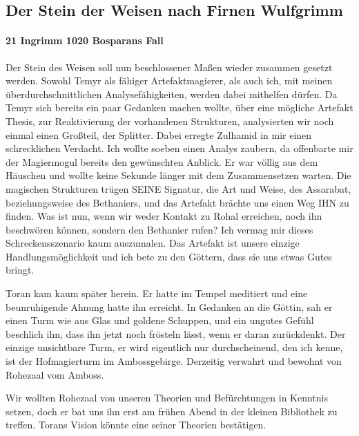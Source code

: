 \subsection{Der Stein der Weisen nach Firnen Wulfgrimm}

\paragraph{21 Ingrimm 1020 Bosparans Fall}
Der Stein des Weisen soll nun beschlossener Maßen wieder zusammen gesetzt werden. Sowohl Temyr als fähiger Artefaktmagierer, als auch ich, mit meinen überdurchschnittlichen Analysefähigkeiten, werden dabei mithelfen dürfen. Da Temyr sich bereits ein paar Gedanken machen wollte, über eine mögliche Artefakt Thesis, zur Reaktivierung der vorhandenen Strukturen, analysierten wir noch einmal einen Großteil, der Splitter. Dabei erregte Zulhamid in mir einen schrecklichen Verdacht. Ich wollte soeben einen Analys zaubern, da offenbarte mir der Magiermogul bereits den gewünschten Anblick. Er war völlig aus dem Häuschen und wollte keine Sekunde länger mit dem Zusammensetzen warten. Die magischen Strukturen trügen SEINE Signatur, die Art und Weise, des Assarabat, beziehungsweise des Bethaniers, und das Artefakt brächte uns einen Weg IHN zu finden. Was ist nun, wenn wir weder Kontakt zu Rohal erreichen, noch ihn beschwören können, sondern den Bethanier rufen? Ich vermag mir dieses Schreckensszenario kaum auszumalen. Das Artefakt ist unsere einzige Handlungsmöglichkeit und ich bete zu den Göttern, dass sie uns etwas Gutes bringt.

Toran kam kaum später herein. Er hatte im Tempel meditiert und eine beunruhigende Ahnung hatte ihn erreicht. In Gedanken an die Göttin, sah er einen Turm wie aus Glas und goldene Schuppen, und ein ungutes Gefühl beschlich ihn, dass ihn jetzt noch frösteln lässt, wenn er daran zurückdenkt. Der einzige unsichtbare Turm, er wird eigentlich nur durchscheinend, den ich kenne, ist der Hofmagierturm im Ambossgebirge. Derzeitig verwahrt und bewohnt von Rohezaal vom Amboss.

Wir wollten Rohezaal von unseren Theorien und Befürchtungen in Kenntnis setzen, doch er bat uns ihn erst am frühen Abend in der kleinen Bibliothek zu treffen. Torans Vision könnte eine seiner Theorien bestätigen.

